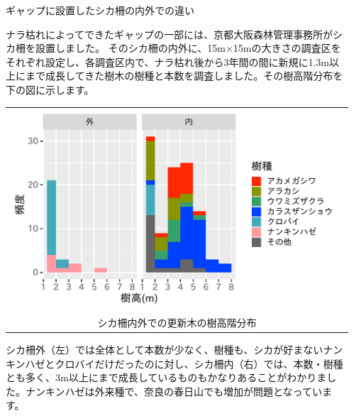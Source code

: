 \documentclass[unicode]{beamer}
\begin{document}
\begin{frame}
\begin{columns}[t]
\begin{column}{.49\linewidth}
\end{column}

\begin{column}{.49\linewidth}
\begin{block}{ギャップに設置したシカ柵の内外での違い}

ナラ枯れによってできたギャップの一部には、京都大阪森林管理事務所がシカ柵を設置しました。
そのシカ柵の内外に、15m×15mの大きさの調査区をそれぞれ設定し、各調査区内で、ナラ枯れ後から3年間の間に新規に1.3m以上にまで成長してきた樹木の樹種と本数を調査しました。その樹高階分布を下の図に示します。

\vspace{3cm}
\begin{tabular}{c}
\includegraphics[width=25cm]{fence.pdf} \\
{\small シカ柵内外での更新木の樹高階分布}
\end{tabular}

\vspace{3cm}

シカ柵外（左）では全体として本数が少なく、樹種も、シカが好まないナンキンハゼとクロバイだけだったのに対し、シカ柵内（右）では、本数・樹種とも多く、3m以上にまで成長しているものもかなりあることがわかりました。ナンキンハゼは外来種で、奈良の春日山でも増加が問題となっています。


\end{block}
\end{column}
\end{columns}
\end{frame}
\end{document}
